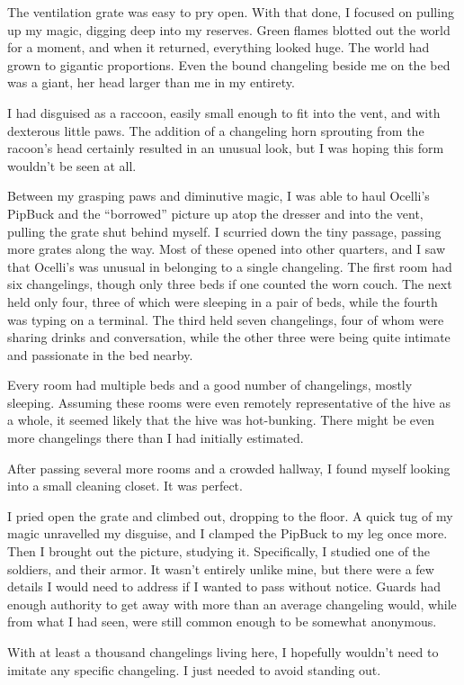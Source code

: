 The ventilation grate was easy to pry open. With that done, I focused on pulling up my magic, digging deep into my reserves. Green flames blotted out the world for a moment, and when it returned, everything looked huge. The world had grown to gigantic proportions. Even the bound changeling beside me on the bed was a giant, her head larger than me in my entirety.

I had disguised as a raccoon, easily small enough to fit into the vent, and with dexterous little paws. The addition of a changeling horn sprouting from the racoon’s head certainly resulted in an unusual look, but I was hoping this form wouldn’t be seen at all.

Between my grasping paws and diminutive magic, I was able to haul Ocelli’s PipBuck and the “borrowed” picture up atop the dresser and into the vent, pulling the grate shut behind myself. I scurried down the tiny passage, passing more grates along the way. Most of these opened into other quarters, and I saw that Ocelli’s was unusual in belonging to a single changeling. The first room had six changelings, though only three beds if one counted the worn couch. The next held only four, three of which were sleeping in a pair of beds, while the fourth was typing on a terminal. The third held seven changelings, four of whom were sharing drinks and conversation, while the other three were being quite intimate and passionate in the bed nearby.

Every room had multiple beds and a good number of changelings, mostly sleeping. Assuming these rooms were even remotely representative of the hive as a whole, it seemed likely that the hive was hot-bunking. There might be even more changelings there than I had initially estimated.

After passing several more rooms and a crowded hallway, I found myself looking into a small cleaning closet. It was perfect.

I pried open the grate and climbed out, dropping to the floor. A quick tug of my magic unravelled my disguise, and I clamped the PipBuck to my leg once more. Then I brought out the picture, studying it. Specifically, I studied one of the soldiers, and their armor. It wasn’t entirely unlike mine, but there were a few details I would need to address if I wanted to pass without notice. Guards had enough authority to get away with more than an average changeling would, while from what I had seen, were still common enough to be somewhat anonymous.

With at least a thousand changelings living here, I hopefully wouldn’t need to imitate any specific changeling. I just needed to avoid standing out.


